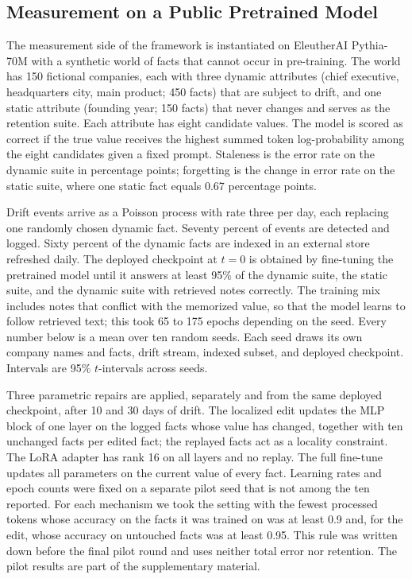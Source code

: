\documentclass[journal]{IEEEtran}
\begin{document}
\subsection{Measurement on a Public Pretrained Model}
The measurement side of the framework is instantiated on EleutherAI Pythia-70M \cite{biderman2023} with a synthetic world of facts that cannot occur in pre-training. The world has 150 fictional companies, each with three dynamic attributes (chief executive, headquarters city, main product; 450 facts) that are subject to drift, and one static attribute (founding year; 150 facts) that never changes and serves as the retention suite. Each attribute has eight candidate values. The model is scored as correct if the true value receives the highest summed token log-probability among the eight candidates given a fixed prompt. Staleness is the error rate on the dynamic suite in percentage points; forgetting is the change in error rate on the static suite, where one static fact equals 0.67 percentage points.

Drift events arrive as a Poisson process with rate three per day, each replacing one randomly chosen dynamic fact. Seventy percent of events are detected and logged. Sixty percent of the dynamic facts are indexed in an external store refreshed daily. The deployed checkpoint at $t=0$ is obtained by fine-tuning the pretrained model until it answers at least 95\% of the dynamic suite, the static suite, and the dynamic suite with retrieved notes correctly. The training mix includes notes that conflict with the memorized value, so that the model learns to follow retrieved text; this took 65 to 175 epochs depending on the seed. Every number below is a mean over ten random seeds. Each seed draws its own company names and facts, drift stream, indexed subset, and deployed checkpoint. Intervals are 95\% $t$-intervals across seeds.

Three parametric repairs are applied, separately and from the same deployed checkpoint, after 10 and 30 days of drift. The localized edit updates the MLP block of one layer on the logged facts whose value has changed, together with ten unchanged facts per edited fact; the replayed facts act as a locality constraint. The LoRA adapter \cite{hu2022} has rank 16 on all layers and no replay. The full fine-tune updates all parameters on the current value of every fact. Learning rates and epoch counts were fixed on a separate pilot seed that is not among the ten reported. For each mechanism we took the setting with the fewest processed tokens whose accuracy on the facts it was trained on was at least 0.9 and, for the edit, whose accuracy on untouched facts was at least 0.95. This rule was written down before the final pilot round and uses neither total error nor retention. The pilot results are part of the supplementary material.
\end{document}
